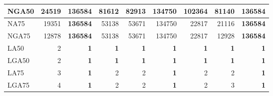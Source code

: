 \documentclass[12pt]{article}
\begin{document}
\begin{table}[h!]
\begin{center}
{\begin{tabular}{|l*{8}{|r}|}
NGA50 & 24519 & {\bf 136584} & 81612 & 82913 & 134750 & 102364 & 81140 & {\bf 136584} \\ \hline
NA75 & 19351 & {\bf 136584} & 53138 & 53671 & 134750 & 22817 & 21116 & {\bf 136584} \\ \hline
NGA75 & 12878 & {\bf 136584} & 53138 & 53671 & 134750 & 22817 & 12928 & {\bf 136584} \\ \hline
LA50 & 2 & {\bf 1} & {\bf 1} & {\bf 1} & {\bf 1} & {\bf 1} & {\bf 1} & {\bf 1} \\ \hline
LGA50 & 2 & {\bf 1} & {\bf 1} & {\bf 1} & {\bf 1} & {\bf 1} & {\bf 1} & {\bf 1} \\ \hline
LA75 & 3 & {\bf 1} & 2 & 2 & {\bf 1} & 2 & 2 & {\bf 1} \\ \hline
LGA75 & 4 & {\bf 1} & 2 & 2 & {\bf 1} & 2 & 3 & {\bf 1} \\ \hline
\end{tabular}
}
\end{center}
\end{table}
\end{document}
